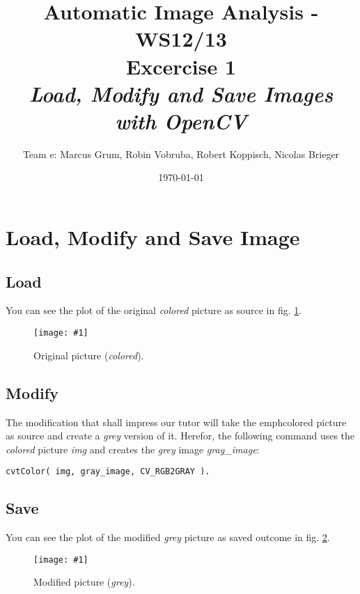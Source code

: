 \documentclass[a4paper,headings=small]{scrartcl}
\title{Automatic Image Analysis - WS12/13 \\ Excercise 1 \\ \emph{Load, Modify and Save Images with OpenCV}}
\author{Team e: Marcus Grum, Robin Vobruba, Robert Koppisch, Nicolas Brieger}
\date{\today}
\numberwithin{equation}{section} %
\numberwithin{figure}{section}   %
\newcommand{\image}[3]{
	\begin{figure}[htbp]
		\centering
		\texttt{[image: \#1]}
		\caption{#3}
		\label{fig:#1}
	\end{figure}
}
\begin{document}
\maketitle



\section{Load, Modify and Save Image}


\subsection{Load}

You can see the plot of the original \emph{colored} picture as source
in fig. \ref{fig:../../../target/input}.

\image{../../../target/input}{0.5}{%
		Original picture (\emph{colored}).}



\subsection{Modify}

The modification that shall impress our tutor will take the emph{colored} picture as source 
and create a \emph{grey} version of it. Herefor, the following command uses the \emph{colored} 
picture \emph{img} and creates the \emph{grey} image \emph{gray\_image}:
\begin{lstlisting}
cvtColor( img, gray_image, CV_RGB2GRAY ).
\end{lstlisting}

\newpage

\subsection{Save}

You can see the plot of the modified \emph{grey} picture as saved outcome
in fig. \ref{fig:../../../target/result}.

\image{../../../target/result}{0.5}{%
		Modified picture (\emph{grey}).}
\end{document}
